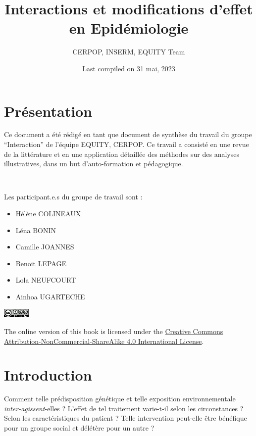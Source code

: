 \documentclass[
]{book}
\title{Interactions et modifications d'effet en Epidémiologie}
\author{CERPOP, INSERM, EQUITY Team}
\date{Last compiled on 31 mai, 2023}
\providecommand{\tightlist}{%
  \setlength{\itemsep}{0pt}\setlength{\parskip}{0pt}}
\begin{document}
\maketitle

{
\setcounter{tocdepth}{1}
\tableofcontents
}
\hypertarget{pruxe9sentation}{%
\chapter{Présentation}\label{pruxe9sentation}}

Ce document a été rédigé en tant que document de synthèse du travail du groupe ``Interaction'' de l'équipe EQUITY, CERPOP.
Ce travail a consisté en une revue de la littérature et en une application détaillée des méthodes sur des analyses illustratives, dans un but d'auto-formation et pédagogique.

\includegraphics[width=0\textwidth,height=\textheight]{img/Image0.png}

Les participant.e.s du groupe de travail sont :

\begin{itemize}
\tightlist
\item
  Hélène COLINEAUX\\
\item
  Léna BONIN
\item
  Camille JOANNES
\item
  Benoit LEPAGE
\item
  Lola NEUFCOURT
\item
  Ainhoa UGARTECHE
\end{itemize}

\includegraphics[width=0.1\textwidth,height=\textheight]{img/by-nc-sa.png}

The online version of this book is licensed under the \href{https://creativecommons.org/licenses/by-nc-sa/4.0/}{Creative Commons Attribution-NonCommercial-ShareAlike 4.0 International License}.

\hypertarget{introduction}{%
\chapter{Introduction}\label{introduction}}

Comment telle prédisposition génétique et telle exposition environnementale \emph{inter-agissent}-elles ? L'effet de tel traitement varie-t-il selon les circonstances ? Selon les caractéristiques du patient ? Telle intervention peut-elle être bénéfique pour un groupe social et délétère pour un autre ?
\end{document}
